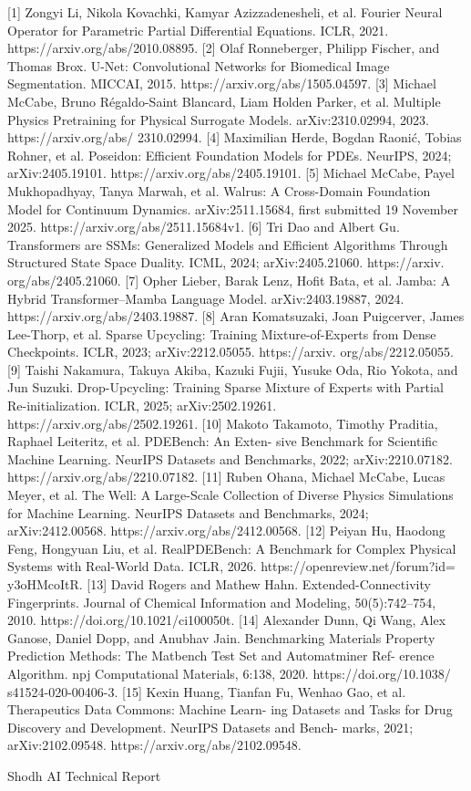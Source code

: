 \documentclass[11pt]{article}
\begin{document}
[1] Zongyi Li, Nikola Kovachki, Kamyar Azizzadenesheli, et al. Fourier Neural Operator for
Parametric Partial Differential Equations. ICLR, 2021. https://arxiv.org/abs/2010.08895.
[2] Olaf Ronneberger, Philipp Fischer, and Thomas Brox. U-Net: Convolutional Networks for
Biomedical Image Segmentation. MICCAI, 2015. https://arxiv.org/abs/1505.04597.
[3] Michael McCabe, Bruno Régaldo-Saint Blancard, Liam Holden Parker, et al. Multiple Physics
Pretraining for Physical Surrogate Models. arXiv:2310.02994, 2023. https://arxiv.org/abs/
2310.02994.
[4] Maximilian Herde, Bogdan Raonić, Tobias Rohner, et al. Poseidon: Efficient Foundation
Models for PDEs. NeurIPS, 2024; arXiv:2405.19101. https://arxiv.org/abs/2405.19101.
[5] Michael McCabe, Payel Mukhopadhyay, Tanya Marwah, et al. Walrus: A Cross-Domain
Foundation Model for Continuum Dynamics. arXiv:2511.15684, first submitted 19 November
2025. https://arxiv.org/abs/2511.15684v1.
[6] Tri Dao and Albert Gu. Transformers are SSMs: Generalized Models and Efficient Algorithms
Through Structured State Space Duality. ICML, 2024; arXiv:2405.21060. https://arxiv.
org/abs/2405.21060.
[7] Opher Lieber, Barak Lenz, Hofit Bata, et al. Jamba: A Hybrid Transformer–Mamba Language
Model. arXiv:2403.19887, 2024. https://arxiv.org/abs/2403.19887.
[8] Aran Komatsuzaki, Joan Puigcerver, James Lee-Thorp, et al. Sparse Upcycling: Training
Mixture-of-Experts from Dense Checkpoints. ICLR, 2023; arXiv:2212.05055. https://arxiv.
org/abs/2212.05055.
[9] Taishi Nakamura, Takuya Akiba, Kazuki Fujii, Yusuke Oda, Rio Yokota, and Jun Suzuki.
Drop-Upcycling: Training Sparse Mixture of Experts with Partial Re-initialization. ICLR,
2025; arXiv:2502.19261. https://arxiv.org/abs/2502.19261.
[10] Makoto Takamoto, Timothy Praditia, Raphael Leiteritz, et al. PDEBench: An Exten-
sive Benchmark for Scientific Machine Learning. NeurIPS Datasets and Benchmarks, 2022;
arXiv:2210.07182. https://arxiv.org/abs/2210.07182.
[11] Ruben Ohana, Michael McCabe, Lucas Meyer, et al. The Well: A Large-Scale Collection of
Diverse Physics Simulations for Machine Learning. NeurIPS Datasets and Benchmarks, 2024;
arXiv:2412.00568. https://arxiv.org/abs/2412.00568.
[12] Peiyan Hu, Haodong Feng, Hongyuan Liu, et al. RealPDEBench: A Benchmark for Complex
Physical Systems with Real-World Data. ICLR, 2026. https://openreview.net/forum?id=
y3oHMcoItR.
[13] David Rogers and Mathew Hahn. Extended-Connectivity Fingerprints. Journal of Chemical
Information and Modeling, 50(5):742–754, 2010. https://doi.org/10.1021/ci100050t.
[14] Alexander Dunn, Qi Wang, Alex Ganose, Daniel Dopp, and Anubhav Jain. Benchmarking
Materials Property Prediction Methods: The Matbench Test Set and Automatminer Ref-
erence Algorithm. npj Computational Materials, 6:138, 2020. https://doi.org/10.1038/
s41524-020-00406-3.
[15] Kexin Huang, Tianfan Fu, Wenhao Gao, et al. Therapeutics Data Commons: Machine Learn-
ing Datasets and Tasks for Drug Discovery and Development. NeurIPS Datasets and Bench-
marks, 2021; arXiv:2102.09548. https://arxiv.org/abs/2102.09548.





\noindent Shodh AI Technical Report\par
\end{document}

